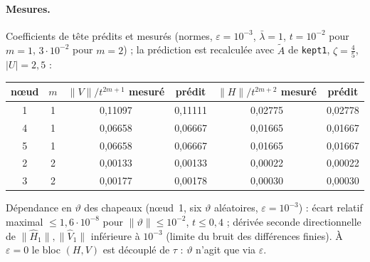 \documentclass[11pt,a4paper]{article}
\theoremstyle{remark}
\newcommand{\vth}{\vartheta}
\begin{document}
\paragraph{Mesures.} Coefficients de t\^ete pr\'edits et mesur\'es (normes, $\varepsilon=10^{-3}$, $\bar\lambda=1$, $t=10^{-2}$ pour $m=1$, $3\cdot10^{-2}$ pour $m=2$) ; la pr\'ediction est recalcul\'ee avec $\tilde A$ de \texttt{kept1}, $\zeta=\frac45$, $\lvert U\rvert=2{,}5$ :
\begin{center}\small
\begin{tabular}{cc|cc|cc}
\toprule
n\oe ud & $m$ & $\lVert V\rVert/t^{2m+1}$ mesur\'e & pr\'edit & $\lVert H\rVert/t^{2m+2}$ mesur\'e & pr\'edit\\
\midrule
1 & 1 & 0,11097 & 0,11111 & 0,02775 & 0,02778\\
4 & 1 & 0,06658 & 0,06667 & 0,01665 & 0,01667\\
5 & 1 & 0,06658 & 0,06667 & 0,01665 & 0,01667\\
2 & 2 & 0,00133 & 0,00133 & 0,00022 & 0,00022\\
3 & 2 & 0,00177 & 0,00178 & 0,00030 & 0,00030\\
\bottomrule
\end{tabular}
\end{center}
D\'ependance en $\vth$ des chapeaux (n\oe ud~1, six $\vth$ al\'eatoires, $\varepsilon=10^{-3}$) : \'ecart relatif maximal $\le1{,}6\cdot10^{-8}$ pour $\lVert\vth\rVert\le10^{-2}$, $t\le0{,}4$ ; d\'eriv\'ee seconde directionnelle de $\lVert\hat H_1\rVert,\lVert\hat V_1\rVert$ inf\'erieure \`a $10^{-3}$ (limite du bruit des diff\'erences finies). \`A $\varepsilon=0$ le bloc $(H,V)$ est d\'ecoupl\'e de $\tau$ : $\vth$ n'agit que via $\varepsilon$.
\end{document}

